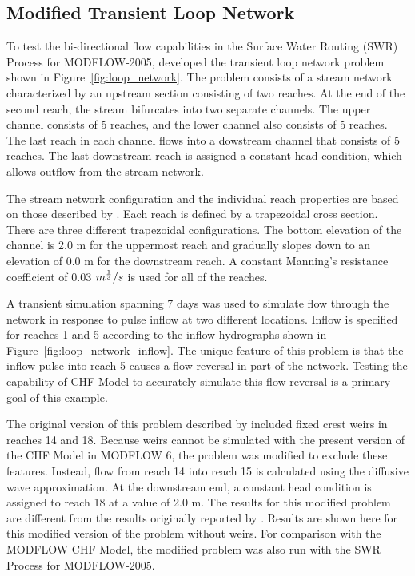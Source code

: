 \documentclass[fleqn]{article}
\begin{document}
\subsection{Modified Transient Loop Network}
To test the bi-directional flow capabilities in the Surface Water Routing (SWR) Process for MODFLOW-2005, \cite{hughes2012documentation} developed the transient loop network problem shown in Figure~\ref{fig:loop_network}.  The problem consists of a stream network characterized by an upstream section consisting of two reaches.  At the end of the second reach, the stream bifurcates into two separate channels.  The upper channel consists of 5 reaches, and the lower channel also consists of 5 reaches.  The last reach in each channel flows into a dowstream channel that consists of 5 reaches.  The last downstream reach is assigned a constant head condition, which allows outflow from the stream network.  

The stream network configuration and the individual reach properties are based on those described by \cite{hughes2012documentation}.  Each reach is defined by a trapezoidal cross section.  There are three different trapezoidal configurations.  The bottom elevation of the channel is 2.0 m for the uppermost reach and gradually slopes down to an elevation of 0.0 m for the downstream reach.  A constant Manning's resistance coefficient of 0.03 $m^{1 \over 3}/s$ is used for all of the reaches.

A transient simulation spanning 7 days was used to simulate flow through the network in response to pulse inflow at two different locations.  Inflow is specified for reaches 1 and 5 according to the inflow hydrographs shown in Figure~\ref{fig:loop_network_inflow}.  The unique feature of this problem is that the inflow pulse into reach 5 causes a flow reversal in part of the network.  Testing the capability of CHF Model to accurately simulate this flow reversal is a primary goal of this example.

The original version of this problem described by  \cite{hughes2012documentation} included fixed crest weirs in reaches 14 and 18.  Because weirs cannot be simulated with the present version of the CHF Model in MODFLOW 6, the problem was modified to exclude these features.  Instead, flow from reach 14 into reach 15 is calculated using the diffusive wave approximation.  At the downstream end, a constant head condition is assigned to reach 18 at a value of 2.0 m.  The results for this modified problem are different from the results originally reported by \cite{hughes2012documentation}.  Results are shown here for this modified version of the problem without weirs.  For comparison with the MODFLOW CHF Model, the modified problem was also run with the SWR Process for MODFLOW-2005.
\end{document}
